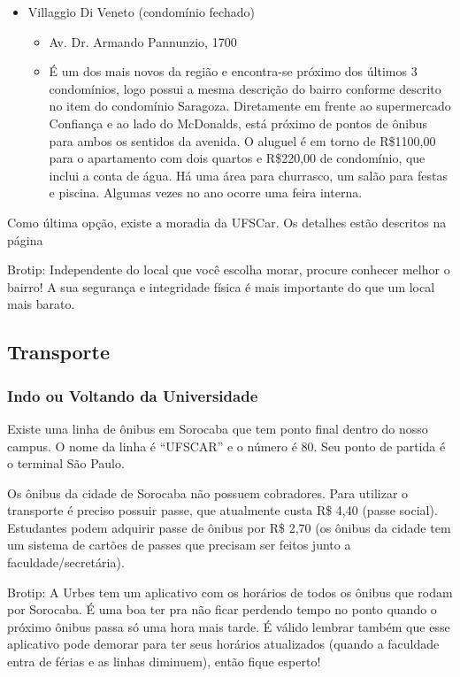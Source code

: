 \begin{itemize}
  \item Villaggio Di Veneto (condomínio fechado)
    \begin{itemize}
      \item Av. Dr. Armando Pannunzio, 1700
      \item {É um dos mais novos da região e encontra-se próximo dos últimos 3 condomínios, logo possui a mesma descrição do bairro conforme descrito no item do condomínio Saragoza. Diretamente em frente ao supermercado Confiança e ao lado do McDonalds, está próximo de pontos de ônibus para ambos os sentidos da avenida.
        O aluguel é em torno de R\$1100,00 para o apartamento com dois quartos e R\$220,00 de condomínio, que inclui a conta de água. Há uma área para churrasco, um salão para festas e piscina. Algumas vezes no ano ocorre uma feira interna.}
    \end{itemize}
\end{itemize}

Como última opção, existe a moradia da UFSCar. Os detalhes estão descritos na página \pageref{moradia}

Brotip: Independente do local que você escolha morar, procure conhecer melhor o bairro! A sua segurança e integridade física é mais importante do que um local mais barato.

\subsection{Transporte}
\subsubsection{Indo ou Voltando da Universidade}
Existe uma linha de ônibus em Sorocaba que tem ponto final dentro do nosso campus. O nome da linha é “UFSCAR” e o número é 80. Seu ponto de partida é o terminal São Paulo.

Os ônibus da cidade de Sorocaba não possuem cobradores. Para utilizar o transporte é preciso possuir passe, que atualmente custa R\$ 4,40 (passe social). Estudantes podem adquirir passe de ônibus por R\$ 2,70 (os ônibus da cidade tem um sistema de cartões de passes que precisam ser feitos junto a faculdade/secretária).

Brotip: A Urbes tem um aplicativo com os horários de todos os ônibus que rodam por Sorocaba. É uma boa ter pra não ficar perdendo tempo no ponto quando o próximo ônibus passa só uma hora mais tarde. É válido lembrar também que esse aplicativo pode demorar para ter seus horários atualizados (quando a faculdade entra de férias e as linhas diminuem), então fique esperto!

